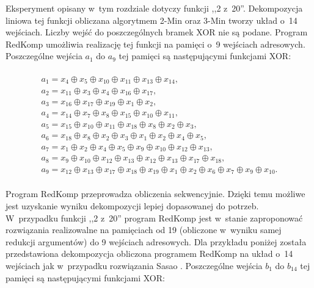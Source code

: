 Eksperyment opisany w~tym rozdziale dotyczy funkcji ,,2 z~20''.
Dekompozycja liniowa tej funkcji obliczana algorytmem 2-Min oraz 3-Min \cite{sasao-s-min} tworzy układ o~14 wejściach.
Liczby wejść do poszczególnych bramek XOR nie są podane.
Program RedKomp umożliwia realizację tej funkcji na pamięci o~9 wejściach adresowych.
Poszczególne wejścia $a_1$ do $a_9$ tej pamięci są następującymi funkcjami XOR:

\begin{multline} \\
a_1 = x_{4} \oplus x_{5} \oplus x_{10} \oplus x_{11} \oplus x_{13} \oplus x_{14}, \\
a_2 = x_{11} \oplus x_{3} \oplus x_{4} \oplus x_{16} \oplus x_{17}, \\
a_3 = x_{16} \oplus x_{17} \oplus x_{19} \oplus x_{1} \oplus x_{2}, \\
a_4 = x_{14} \oplus x_{7} \oplus x_{8} \oplus x_{15} \oplus x_{10} \oplus x_{11}, \\
a_5 = x_{15} \oplus x_{10} \oplus x_{11} \oplus x_{18} \oplus x_{8} \oplus x_{2} \oplus x_{3}, \\
a_6 = x_{18} \oplus x_{8} \oplus x_{2} \oplus x_{3} \oplus x_{1} \oplus x_{2} \oplus x_{4} \oplus x_{5}, \\
a_7 = x_{1} \oplus x_{2} \oplus x_{4} \oplus x_{5} \oplus x_{9} \oplus x_{10} \oplus x_{12} \oplus x_{13}, \\
a_8 = x_{9} \oplus x_{10} \oplus x_{12} \oplus x_{13} \oplus x_{12} \oplus x_{13} \oplus x_{17} \oplus x_{18}, \\
a_9 = x_{12} \oplus x_{13} \oplus x_{17} \oplus x_{18} \oplus x_{19} \oplus x_{1} \oplus x_{2} \oplus x_{6} \oplus x_{7} \oplus x_{9} \oplus x_{10}. \\
\end{multline}

Program RedKomp przeprowadza obliczenia sekwencyjnie.
Dzięki temu możliwe jest uzyskanie wyniku dekompozycji lepiej dopasowanej do potrzeb.
W~przypadku funkcji ,,2 z~20''
program RedKomp jest w~stanie zaproponować rozwiązania realizowalne na pamięciach
od 19 (obliczone w~wyniku samej redukcji argumentów) do 9 wejściach adresowych.
Dla przykładu poniżej została przedstawiona dekompozycja obliczona programem RedKomp na układ o~14 wejściach jak w~przypadku rozwiązania Sasao \cite{sasao-s-min}.
Poszczególne wejścia $b_1$ do $b_{14}$ tej pamięci są następującymi funkcjami XOR:


